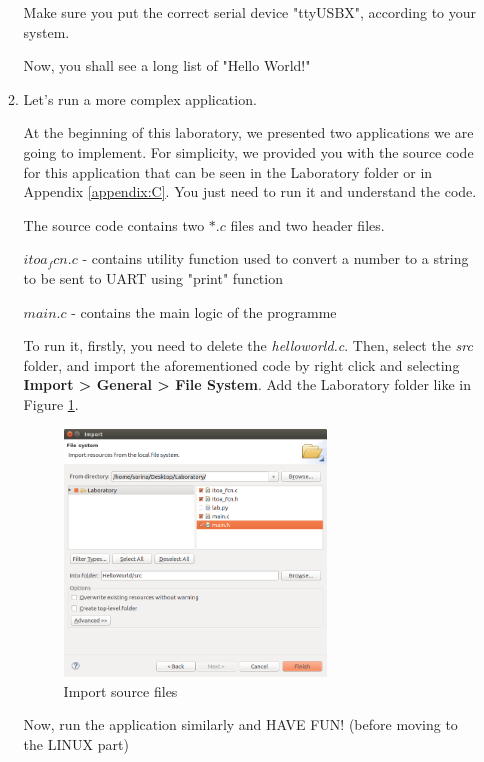 \documentclass{article}
\begin{document}
\begin{itemize}
\begin{enumerate}
Make sure you put the correct serial device "ttyUSBX", according to your system.

Now, you shall see a long list of "Hello World!"

\item Let's run a more complex application.

At the beginning of this laboratory, we presented two applications we are going to implement. For simplicity, we provided you with the source code for this application that can be seen in the Laboratory folder or in Appendix \ref{appendix:C}. You just need to run it and understand the code. 


The source code contains two $*.c$ files and two header files.


$itoa_fcn.c$ - contains utility function used to convert a number to a string to be sent to UART using "print" function

$main.c$ - contains the main logic of the programme


To run it, firstly, you need to delete the \textit{helloworld.c}. Then, select the \textit{src} folder, and import the aforementioned code by right click and selecting \textbf{Import > General > File System}. Add the Laboratory folder like in Figure \ref{fig:import}.

 \begin{figure}[h!]
    \centering
    \includegraphics[width=0.7\textwidth]{img/run/import.png}
    \caption{Import source files}
    \label{fig:import}
\end{figure}

Now, run the application similarly and HAVE FUN! (before moving to the LINUX part)

\end{enumerate}




\end{itemize}
\end{document}
